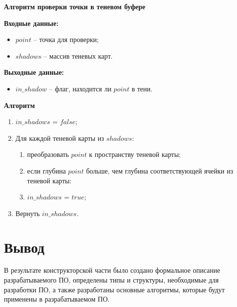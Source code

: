 \textbf{Алгоритм проверки точки в теневом буфере}

\textbf{Входные данные:}
\begin{itemize}
	\item $point$ -- точка для проверки;
	\item $shadows$ -- массив теневых карт.
\end{itemize}

\textbf{Выходные данные:}
\begin{itemize}
	\item $in\_shadow$ -- флаг, находится ли $point$ в тени.
\end{itemize}

\textbf{Алгоритм}
\begin{enumerate}
	\item $in\_shadows$ = $false$;
	\item Для каждой теневой карты из $shadows$:
	\begin{enumerate}
		\item преобразовать $point$ к пространству теневой карты;
		\item если глубина $point$ больше, чем глубина соответствующей ячейки из теневой карты:
		\item $in\_shadows$ = $true$;
	\end{enumerate}
	\item Вернуть $in\_shadows$.
\end{enumerate}


\section*{Вывод}

В результате конструкторской части было создано формальное описание разрабатываемого ПО, определены типы и структуры, необходимые для разработки ПО, а также разработаны основные алгоритмы, которые будут применены в разрабатываемом ПО.

\clearpage
